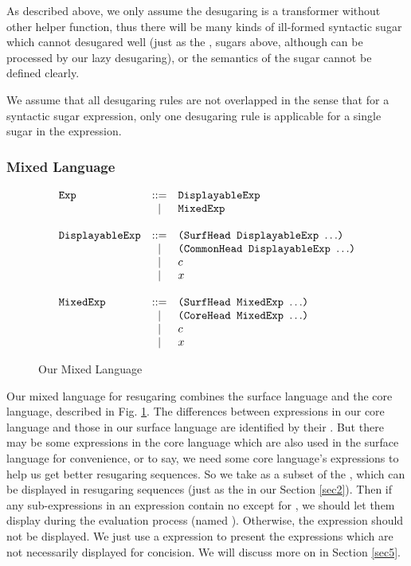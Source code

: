 As described above, we only assume the desugaring is a transformer without other helper function, thus there will be many kinds of ill-formed syntactic sugar which cannot desugared well (just as the ,  sugars above, although can be processed by our lazy desugaring), or the semantics of the sugar cannot be defined clearly. 

We assume that all desugaring rules are not overlapped in the sense that for a syntactic sugar expression, only one desugaring rule is applicable for a single sugar in the expression.


\subsubsection{Mixed Language}
\begin{figure}[t]
\begin{centering}
{\footnotesize
\[
			\begin{array}{lcl}
			\mbox{\tt Exp} &::=& \mbox{\tt DisplayableExp}\\
			&|& \mbox{\tt MixedExp}\\
			\\
			\mbox{\tt DisplayableExp} &::=& \mbox{\tt (SurfHead~DisplayableExp~$\ldots$)}\\
			&|& \mbox{\tt (CommonHead~DisplayableExp~$\ldots$)}\\
			&|& c\\
			&|& x\\
			\\
			\mbox{\tt MixedExp} &::=& \mbox{\tt (SurfHead~MixedExp~$\ldots$)}\\
			&|& \mbox{\tt (CoreHead~MixedExp~$\ldots$)}\\
			&|& c\\
			&|& x\\
			\end{array}
			\]
}

\end{centering}
\caption{Our Mixed Language}
\label{fig:mix}
\end{figure}

Our mixed language for resugaring combines the surface language and the core language, described in Fig.  \ref{fig:mix}. 
%
The differences between expressions in our core language and those in our surface language are identified by their . But there may be some expressions in the core language which are also used in the surface language for convenience, or to say, we need some core language's expressions to help us get better resugaring sequences. So we take  as a subset of the , which can be displayed in resugaring sequences (just as the  in our Section \ref{sec2}). Then if any sub-expressions in an expression contain no  except for , we should let them display during the evaluation process (named ). Otherwise, the expression should not be displayed. We just use a  expression to present the expressions which are not necessarily displayed for concision. We will discuss more on   in Section \ref{sec5}.

